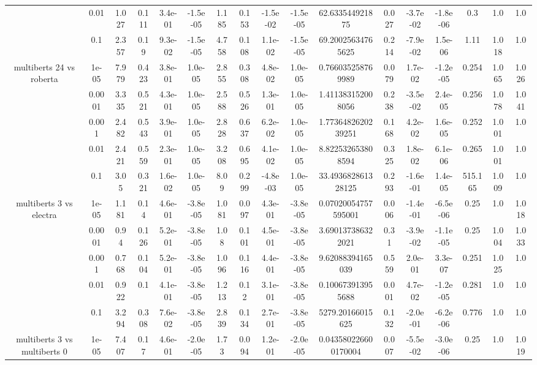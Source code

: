 \begin{tabular}{|c|c|c|c|c|c|c|c|c|c|c|c|c|c|c|c|c|}
 & 0.01 & 1.027 & 0.111 & 3.4e-01 & -1.5e-05 & 1.185 & 0.153 & -1.5e-02 & -1.5e-05 & 62.633544921875 & 0.027 & -3.7e-02 & -1.8e-06 & 0.3 & 1.0 & 1.0 \\
 & 0.1 & 2.357 & 0.19 & 9.3e-02 & -1.5e-05 & 4.758 & 0.108 & 1.1e-02 & -1.5e-05 & 69.20025634765625 & 0.214 & -7.9e-02 & 1.5e-06 & 1.11 & 1.018 & 1.0 \\
\hline
\multirow{5}{*}{multiberts 24 vs roberta } & 1e-05 & 7.979 & 0.423 & 3.8e-01 & 1.0e-05 & 2.855 & 0.308 & 4.8e-02 & 1.0e-05 & 0.766035258769989 & 0.079 & 1.7e-02 & -1.2e-05 & 0.254 & 1.065 & 1.026 \\
 & 0.0001 & 3.335 & 0.521 & 4.3e-01 & 1.0e-05 & 2.588 & 0.526 & 1.3e-01 & 1.0e-05 & 1.411383152008056 & 0.238 & -3.5e-02 & 2.4e-05 & 0.256 & 1.078 & 1.041 \\
 & 0.001 & 2.482 & 0.543 & 3.9e-01 & 1.0e-05 & 2.828 & 0.637 & 6.2e-02 & 1.0e-05 & 1.7736482620239251 & 0.168 & 4.2e-02 & 1.6e-05 & 0.252 & 1.001 & 1.0 \\
 & 0.01 & 2.421 & 0.559 & 2.3e-01 & 1.0e-05 & 3.208 & 0.695 & 4.1e-02 & 1.0e-05 & 8.822532653808594 & 0.325 & 1.8e-02 & 6.1e-06 & 0.265 & 1.001 & 1.0 \\
 & 0.1 & 3.05 & 0.321 & 1.6e-02 & 1.0e-05 & 8.09 & 0.299 & -4.8e-03 & 1.0e-05 & 33.493682861328125 & 0.293 & -1.6e-01 & 1.4e-05 & 515.165 & 1.009 & 1.0 \\
\hline
\multirow{5}{*}{multiberts 3 vs electra } & 1e-05 & 1.181 & 0.14 & 4.6e-01 & -3.8e-05 & 1.081 & 0.097 & 4.3e-01 & -3.8e-05 & 0.07020054757595001 & 0.006 & -1.4e-01 & -6.5e-06 & 0.25 & 1.0 & 1.018 \\
 & 0.0001 & 0.94 & 0.126 & 5.2e-01 & -3.8e-05 & 1.08 & 0.101 & 4.5e-01 & -3.8e-05 & 3.690137386322021 & 0.31 & -3.9e-02 & -1.1e-05 & 0.25 & 1.004 & 1.033 \\
 & 0.001 & 0.768 & 0.104 & 5.2e-01 & -3.8e-05 & 1.096 & 0.116 & 4.4e-01 & -3.8e-05 & 9.62088394165039 & 0.559 & 2.0e-01 & 3.3e-07 & 0.251 & 1.025 & 1.0 \\
 & 0.01 & 0.922 & 0.1 & 4.1e-01 & -3.8e-05 & 1.213 & 0.12 & 3.1e-01 & -3.8e-05 & 0.100673913955688 & 0.001 & 4.7e-02 & -1.2e-05 & 0.281 & 1.0 & 1.0 \\
 & 0.1 & 3.294 & 0.308 & 7.6e-02 & -3.8e-05 & 2.839 & 0.134 & 2.7e-01 & -3.8e-05 & 5279.20166015625 & 0.132 & -2.0e-01 & -6.2e-06 & 0.776 & 1.0 & 1.0 \\
\hline
\multirow{5}{*}{multiberts 3 vs multiberts 0} & 1e-05 & 7.407 & 0.17 & 4.6e-01 & -2.0e-05 & 1.73 & 0.094 & 1.2e-01 & -2.0e-05 & 0.043580226600170004 & 0.007 & -5.5e-02 & -3.0e-06 & 0.25 & 1.0 & 1.019 \\

\end{tabular}
